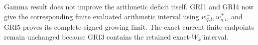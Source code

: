 Gamma result does not improve the arithmetic deficit itself.
GRI1 and GRI4 now give the corresponding finite evaluated
arithmetic interval using $w^-_{q,l},w^+_{q,l}$, and GRI5
proves its complete signed growing limit. The exact current
finite endpoints remain unchanged because GRI3 contains
the retained exact-$W_k$ interval.